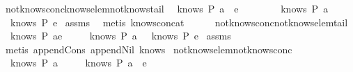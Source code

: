 \begin{isabellebody}
\endisatagproof
{\isafoldproof}%
%
\isadelimproof
\isanewline
%
\endisadelimproof
\isanewline
{}\isamarkupfalse%
\ not{\isacharunderscore}knows{\isacharunderscore}conc{\isacharunderscore}knows{\isacharunderscore}elem{\isacharunderscore}not{\isacharunderscore}knows{\isacharunderscore}tail{\isacharcolon}\isanewline
{}\ {\isachardoublequoteopen}{\isasymnot}\ knows\ P\ {\isacharparenleft}a\ {\isacharhash}\ e{\isacharparenright}{\isachardoublequoteclose}\isanewline
\ \ \ \ \ \ \ \ {\isachardoublequoteopen}knows\ P\ {\isacharbrackleft}a{\isacharbrackright}{\isachardoublequoteclose}\isanewline
{}\ {\isachardoublequoteopen}{\isasymnot}\ knows\ P\ e{\isachardoublequoteclose}\isanewline
%
\isadelimproof
%
\endisadelimproof
%
\isatagproof
{}\isamarkupfalse%
\ assms\ \isamarkupfalse%
\ {\isacharparenleft}metis\ knows{\isacharunderscore}concat{\isacharunderscore}{}{\isacharparenright}%
\endisatagproof
{\isafoldproof}%
%
\isadelimproof
\isanewline
%
\endisadelimproof
\ \ \ \ \isanewline
{}\isamarkupfalse%
\ not{\isacharunderscore}knows{\isacharunderscore}conc{\isacharunderscore}not{\isacharunderscore}knows{\isacharunderscore}elem{\isacharunderscore}tail{\isacharcolon}\isanewline
{}\ {\isachardoublequoteopen}{\isasymnot}\ knows\ P\ {\isacharparenleft}a{\isacharhash}e{\isacharparenright}{\isachardoublequoteclose}\isanewline
{}\ \ \ \ {\isachardoublequoteopen}{\isasymnot}\ knows\ P\ {\isacharbrackleft}a{\isacharbrackright}\ {\isasymor}\ {\isasymnot}\ knows\ P\ e{\isachardoublequoteclose}\isanewline
%
\isadelimproof
%
\endisadelimproof
%
\isatagproof
{}\isamarkupfalse%
\ assms\ \isamarkupfalse%
\ {\isacharparenleft}metis\ append{\isacharunderscore}Cons\ append{\isacharunderscore}Nil\ knows{}{\isacharparenright}%
\endisatagproof
{\isafoldproof}%
%
\isadelimproof
\isanewline
%
\endisadelimproof
\isanewline
{}\isamarkupfalse%
\ not{\isacharunderscore}knows{\isacharunderscore}elem{\isacharunderscore}not{\isacharunderscore}knows{\isacharunderscore}conc{\isacharcolon}\isanewline
{}\ {\isachardoublequoteopen}{\isasymnot}\ knows\ P\ {\isacharbrackleft}a{\isacharbrackright}{\isachardoublequoteclose}\isanewline
{}\ \ \ \ {\isachardoublequoteopen}{\isasymnot}\ knows\ P\ {\isacharparenleft}a\ {\isacharhash}\ e{\isacharparenright}{\isachardoublequoteclose}\isanewline
%
\isadelimproof
%
\endisadelimproof
%
\isatagproof
{}\isamarkupfalse%

\end{isabellebody}
